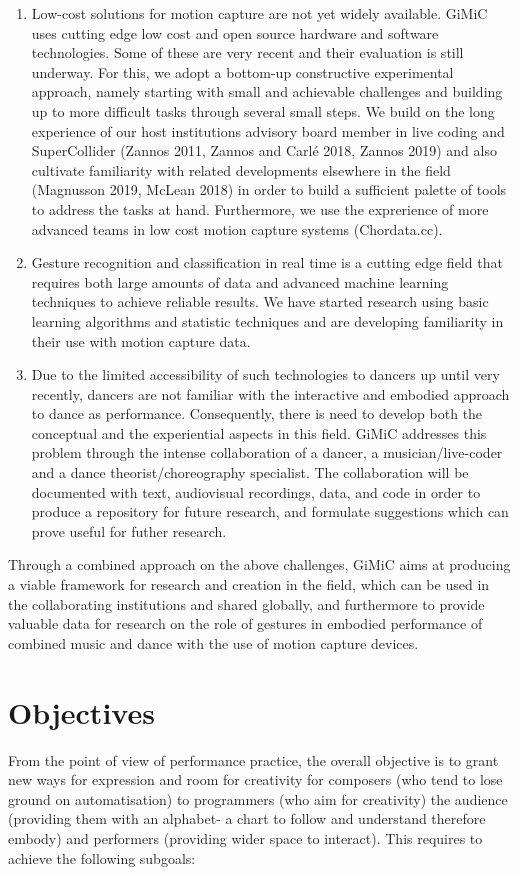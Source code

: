 \begin{enumerate}
\item Low-cost solutions for motion capture are not yet widely available. GiMiC uses cutting edge low cost and open source hardware and software technologies.  Some of these are very recent and their evaluation is still underway.  For this, we adopt a bottom-up constructive experimental approach, namely starting with small and achievable challenges and building up to more difficult tasks through several small steps.  We build on the long experience of our host institutions advisory board member in live coding and SuperCollider (Zannos 2011, Zannos and Carlé 2018, Zannos 2019) and also cultivate familiarity with related developments elsewhere in the field (Magnusson 2019, McLean 2018) in order to build a sufficient palette of tools to address the tasks at hand.  Furthermore, we use the exprerience of more advanced teams in low cost motion capture systems (Chordata.cc).
\item Gesture recognition and classification in real time is a cutting edge field that requires both large amounts of data and advanced machine learning techniques to achieve reliable results.  We have started research using basic learning algorithms and statistic techniques and are developing familiarity in their use with motion capture data.
\item Due to the limited accessibility of such technologies to dancers up until very recently, dancers are not familiar with the interactive and embodied approach to dance as performance.  Consequently, there is need to develop both the conceptual and the experiential aspects in this field.  GiMiC addresses this problem through the intense collaboration of a dancer, a musician/live-coder and a dance theorist/choreography specialist.  The collaboration will be documented with text, audiovisual recordings, data, and code in order to produce a repository for future research, and formulate suggestions which can prove useful for futher research.
\end{enumerate}

Through a combined approach on the above challenges, GiMiC aims at producing a viable framework for research and creation in the field, which can be used in the collaborating institutions and shared globally, and furthermore to provide valuable data for research on the role of gestures in embodied performance of combined music and dance with the use of motion capture devices.

\section{Objectives}
\label{sec:org5cbb45a}
From the point of view of performance practice, the overall objective is to grant new ways for expression and room for creativity for composers (who tend to lose ground on automatisation) to programmers (who aim for creativity) the audience (providing them with an alphabet- a chart to follow and understand therefore embody) and performers (providing wider space to interact).  This requires to achieve the following subgoals:

